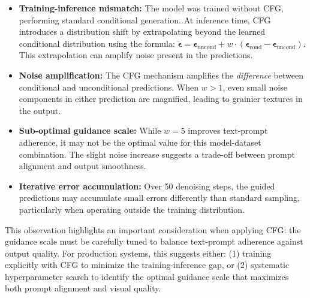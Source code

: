 \begin{itemize}
    \item \textbf{Training-inference mismatch:} The model was trained without CFG, performing standard conditional generation. At inference time, CFG introduces a distribution shift by extrapolating beyond the learned conditional distribution using the formula: $\tilde{\boldsymbol{\epsilon}} = \boldsymbol{\epsilon}_\text{uncond} + w \cdot (\boldsymbol{\epsilon}_\text{cond} - \boldsymbol{\epsilon}_\text{uncond})$. This extrapolation can amplify noise present in the predictions.
    
    \item \textbf{Noise amplification:} The CFG mechanism amplifies the \emph{difference} between conditional and unconditional predictions. When $w > 1$, even small noise components in either prediction are magnified, leading to grainier textures in the output.
    
    \item \textbf{Sub-optimal guidance scale:} While $w=5$ improves text-prompt adherence, it may not be the optimal value for this model-dataset combination. The slight noise increase suggests a trade-off between prompt alignment and output smoothness.
    
    \item \textbf{Iterative error accumulation:} Over 50 denoising steps, the guided predictions may accumulate small errors differently than standard sampling, particularly when operating outside the training distribution.
\end{itemize}

This observation highlights an important consideration when applying CFG: the guidance scale must be carefully tuned to balance text-prompt adherence against output quality. For production systems, this suggests either: (1) training explicitly with CFG to minimize the training-inference gap, or (2) systematic hyperparameter search to identify the optimal guidance scale that maximizes both prompt alignment and visual quality.

